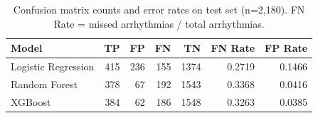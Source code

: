 \begin{table}[htbp]
  \centering
  \caption{Confusion matrix counts and error rates on test set (n=2,180). FN Rate = missed arrhythmias / total arrhythmias.}
  \label{tab:p1_confusion}
  \begin{tabular}{lrrrrrr}
  \toprule
  Model & TP & FP & FN & TN & FN Rate & FP Rate \\
  \midrule
  Logistic Regression & 415 & 236 & 155 & 1374 & 0.2719 & 0.1466 \\
  Random Forest & 378 & 67 & 192 & 1543 & 0.3368 & 0.0416 \\
  XGBoost & 384 & 62 & 186 & 1548 & 0.3263 & 0.0385 \\
  \bottomrule
  \end{tabular}
\end{table}